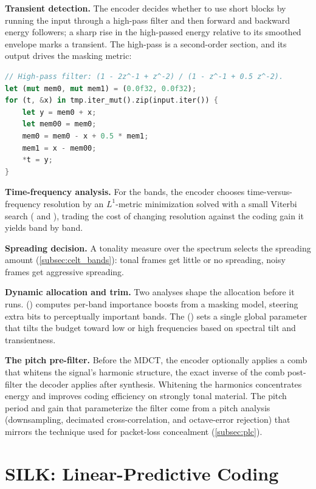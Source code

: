 \textbf{Transient detection.} The encoder decides whether to use short blocks by
running the input through a high-pass filter and then forward and
backward energy
followers; a sharp rise in the high-passed energy relative to its smoothed
envelope marks a transient. The high-pass is a second-order section, and its
output drives the masking metric:

\begin{lstlisting}[language=Rust]
// High-pass filter: (1 - 2z^-1 + z^-2) / (1 - z^-1 + 0.5 z^-2).
let (mut mem0, mut mem1) = (0.0f32, 0.0f32);
for (t, &x) in tmp.iter_mut().zip(input.iter()) {
    let y = mem0 + x;
    let mem00 = mem0;
    mem0 = mem0 - x + 0.5 * mem1;
    mem1 = x - mem00;
    *t = y;
}
\end{lstlisting}

\textbf{Time-frequency analysis.} For the bands, the encoder chooses
time-versus-
frequency resolution by an $L^1$-metric minimization solved with a small Viterbi
search ( and ), trading the cost of changing
resolution against the coding gain it yields band by band.

\textbf{Spreading decision.} A tonality measure over the spectrum selects the
spreading amount (\cref{subsec:celt_bands}): tonal frames get little or no
spreading, noisy frames get aggressive spreading.

\textbf{Dynamic allocation and trim.} Two analyses shape the
allocation before it
runs.  () computes per-band
importance boosts from a masking model, steering extra bits to perceptually
important bands. The  ()
sets a single global parameter that tilts the budget toward low or high
frequencies based on spectral tilt and transientness.

\textbf{The pitch pre-filter.} Before the MDCT, the encoder optionally applies a
comb  that whitens the signal's harmonic
structure, the exact
inverse of the comb post-filter the decoder applies after synthesis. Whitening
the harmonics concentrates energy and improves coding efficiency on strongly
tonal material. The pitch period and gain that parameterize the filter come from
a pitch analysis (downsampling, decimated cross-correlation, and octave-error
rejection) that mirrors the technique used for packet-loss concealment
(\cref{subsec:plc}).

\section{SILK: Linear-Predictive Coding}\label{sec:silk}

